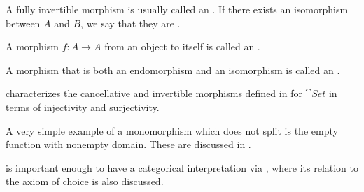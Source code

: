 \begin{definition}
\begin{thmenum}
    A fully invertible morphism is usually called an . If there exists an isomorphism between \( A \) and \( B \), we say that they are .

     A morphism \( f: A \to A \) from an object to itself is called an .

     A morphism that is both an endomorphism and an isomorphism is called an .
  \end{thmenum}
\end{definition}

\begin{example}\label{ex:def:morphism_invertibility}
   characterizes the cancellative and invertible morphisms defined in  for \hyperref[def:category_of_small_sets]{\( \cat{Set} \)} in terms of \hyperref[def:function_invertibility/injective]{injectivity} and \hyperref[def:function_invertibility/injective]{surjectivity}.

  A very simple example of a monomorphism which does not split is the empty function with nonempty domain. These are discussed in .

   is important enough to have a categorical interpretation via , where its relation to the \hyperref[def:zfc/choice]{axiom of choice} is also discussed.
\end{example}

